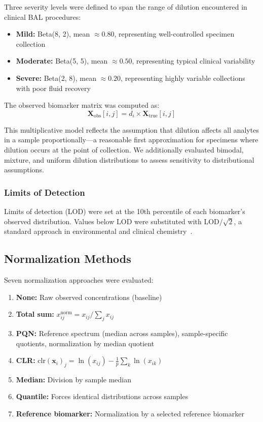 \documentclass[12pt]{article}
\newcommand{\Xobs}{\mathbf{X}_{\mathrm{obs}}}
\newcommand{\Xtrue}{\mathbf{X}_{\mathrm{true}}}
\begin{document}
Three severity levels were defined to span the range of dilution encountered in clinical BAL procedures:
\begin{itemize}
\item \textbf{Mild:} Beta(8, 2), mean $\approx 0.80$, representing well-controlled specimen collection
\item \textbf{Moderate:} Beta(5, 5), mean $\approx 0.50$, representing typical clinical variability
\item \textbf{Severe:} Beta(2, 8), mean $\approx 0.20$, representing highly variable collections with poor fluid recovery
\end{itemize}

The observed biomarker matrix was computed as:
\begin{equation}
\Xobs[i, j] = d_i \times \Xtrue[i, j]
\end{equation}

This multiplicative model reflects the assumption that dilution affects all analytes in a sample proportionally---a reasonable first approximation for specimens where dilution occurs at the point of collection. We additionally evaluated bimodal, mixture, and uniform dilution distributions to assess sensitivity to distributional assumptions.

\subsubsection{Limits of Detection}

Limits of detection (LOD) were set at the 10th percentile of each biomarker's observed distribution. Values below LOD were substituted with LOD$/\sqrt{2}$, a standard approach in environmental and clinical chemistry~\cite{Hornung1990}.

\subsection{Normalization Methods}

Seven normalization approaches were evaluated:
\begin{enumerate}
\item \textbf{None:} Raw observed concentrations (baseline)
\item \textbf{Total sum:} $x_{ij}^{\mathrm{norm}} = x_{ij} / \sum_{j} x_{ij}$
\item \textbf{PQN:} Reference spectrum (median across samples), sample-specific quotients, normalization by median quotient~\cite{Dieterle2006}
\item \textbf{CLR:} $\mathrm{clr}(\mathbf{x}_i)_j = \ln(x_{ij}) - \frac{1}{p} \sum_{k} \ln(x_{ik})$~\cite{Aitchison1986}
\item \textbf{Median:} Division by sample median
\item \textbf{Quantile:} Forces identical distributions across samples~\cite{Bolstad2003}
\item \textbf{Reference biomarker:} Normalization by a selected reference biomarker
\end{enumerate}
\end{document}
